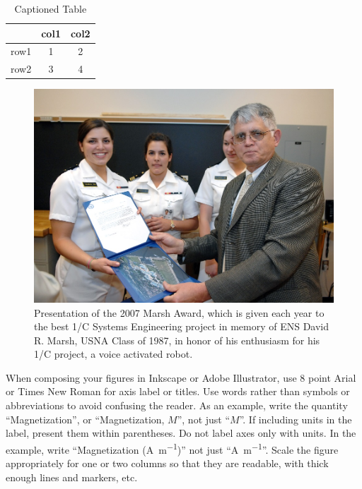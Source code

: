 \documentclass[10pt]{article}
\begin{document}
\begin{table}[hpt]
\caption{Captioned Table}
\label{t1}
\begin{center}
\begin{tabular}{lcc}
\toprule
 & col1 & col2 \\
\midrule
row1 & 1 & 2 \\
row2 & 3 & 4 \\
\bottomrule
\end{tabular}
\end{center}
\end{table}

\begin{figure}[hpb]
\begin{center}
\includegraphics{figures/f6.png}
\end{center}
\caption{Presentation of the 2007 Marsh Award, which is given each year to the best 1/C Systems Engineering project in memory of ENS David R.  Marsh, USNA Class of 1987, in honor of his enthusiasm for his 1/C project, a voice activated robot.}
\label{f6}
\end{figure}

When composing your figures in Inkscape or Adobe Illustrator, use 8 point Arial or Times New Roman for axis label or titles. Use words rather than symbols or abbreviations to avoid confusing the reader. As an example, write the quantity ``Magnetization'', or ``Magnetization, $M$'', not just ``$M$''. If including units in the label, present them within parentheses. Do not label axes only with units. In the example, write ``Magnetization (\si{\ampere\per\meter})'' not just ``\si{\ampere\per\meter}''. Scale the figure appropriately for one or two columns so that they are readable, with thick enough lines and markers, etc. 
\end{document}
